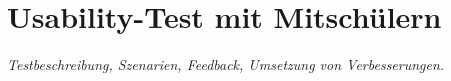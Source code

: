 \section{Usability-Test mit Mitschülern}
\textit{Testbeschreibung, Szenarien, Feedback, Umsetzung von Verbesserungen.}